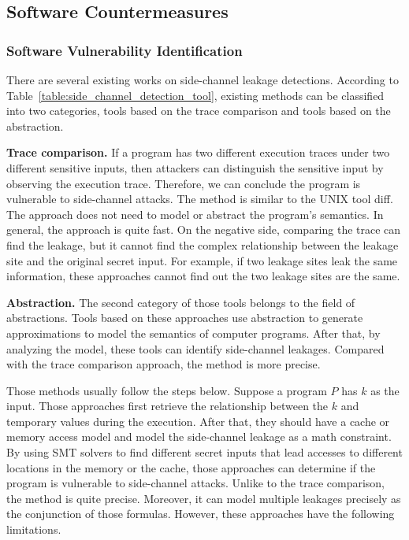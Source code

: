 \subsection{Software Countermeasures}
\subsubsection*{Software Vulnerability Identification}
There are several existing works on side-channel leakage detections. According to Table~\ref{table:side_channel_detection_tool}, existing methods can be classified into two categories, tools based on the trace comparison and tools based on the abstraction.

\textbf{Trace comparison.} If a program has two different execution traces under two different sensitive inputs, then attackers can distinguish the sensitive input by observing the execution trace. Therefore, we can conclude the program is vulnerable to side-channel attacks. The method is similar to the UNIX tool \textsf{diff}.  The approach does not need to model or abstract the program's semantics. In general, the approach is quite fast. On the negative side, comparing the trace can find the leakage, but it cannot find the complex relationship between the leakage site and the original secret input. For example, if two leakage sites leak the same information, these approaches cannot find out the two leakage sites are the same.

\textbf{Abstraction.} The second category of those tools belongs to the field of abstractions. Tools based on these approaches use abstraction to generate approximations to model the semantics of computer programs. After that, by analyzing the model, these tools can identify side-channel leakages. Compared with the trace comparison approach, the method is more precise.

Those methods usually follow the steps below. Suppose a program $P$ has $k$ as the input. Those approaches first retrieve the relationship between the $k$ and temporary values during the execution. After that, they should have a cache or memory access model and model the side-channel leakage as a math constraint. By using SMT solvers to find different secret inputs that lead accesses to different locations in the memory or the cache, those approaches can determine if the program is vulnerable to side-channel attacks.
Unlike to the trace comparison, the method is quite precise. Moreover, it can model multiple leakages precisely as the conjunction of those formulas. However, these approaches have the following limitations.

